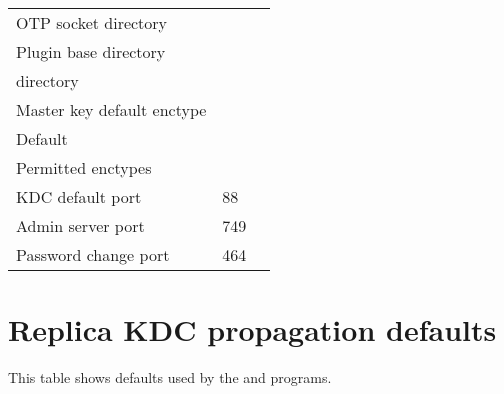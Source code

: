\documentclass[letterpaper,10pt,english]{sphinxmanual}
\begin{document}
\begin{savenotes}
\begin{tabulary}{\linewidth}[t]{|T|T|T|}
&\\
\hline
OTP socket directory
&
{\hyperref[\detokenize{mitK5defaults:paths}]{}}
&\\
\hline
Plugin base directory
&
{\hyperref[\detokenize{mitK5defaults:paths}]{}}
&\\
\hline
{} directory
&
&
\\
\hline
Master key default enctype
&
&\\
\hline
Default {\hyperref[\detokenize{admin/conf_files/kdc_conf:keysalt-lists}]{}}
&
&\\
\hline
Permitted enctypes
&
&\\
\hline
KDC default port
&
88
&\\
\hline
Admin server port
&
749
&\\
\hline
Password change port
&
464
&\\
\hline
\end{tabulary}
\par
\sphinxattableend\end{savenotes}


\section{Replica KDC propagation defaults}
\label{\detokenize{mitK5defaults:replica-kdc-propagation-defaults}}
This table shows defaults used by the {\hyperref[\detokenize{admin/admin_commands/kprop:kprop-8}]{}} and
{\hyperref[\detokenize{admin/admin_commands/kpropd:kpropd-8}]{}} programs.
\end{document}
